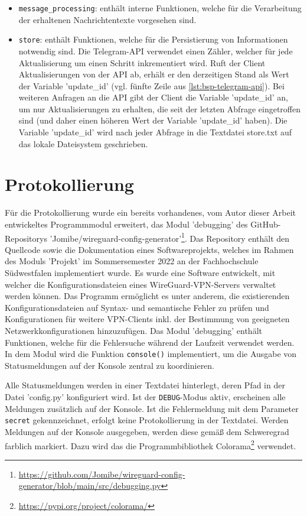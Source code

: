 \begin{itemize}
\item \lstinline{message_processing}: enthält interne Funktionen, welche für die Verarbeitung der erhaltenen Nachrichtentexte vorgesehen sind. 
\item \lstinline{store}: enthält Funktionen, welche für die Persistierung von Informationen notwendig sind. Die Telegram-API verwendet einen Zähler, welcher für jede Aktualisierung um einen Schritt inkrementiert wird. Ruft der Client Aktualisierungen von der API ab, erhält er den derzeitigen Stand als Wert der Variable 'update\_id' (vgl. fünfte Zeile aus \autoref{lst:bsp-telegram-api}). Bei weiteren Anfragen an die API gibt der Client die Variable 'update\_id' an, um nur Aktualisierungen zu erhalten, die seit der letzten Abfrage eingetroffen sind (und daher einen höheren Wert der Variable 'update\_id' haben). Die Variable 'update\_id' wird nach jeder Abfrage in die Textdatei store.txt auf das lokale Dateisystem geschrieben.
\end{itemize}

\section{Protokollierung}
\label{sec:protokollierung}

Für die Protokollierung wurde ein bereits vorhandenes, vom Autor dieser Arbeit entwickeltes Programmmodul erweitert, das Modul 'debugging' des GitHub-Repositorys 'Jomibe/wireguard-config-generator'\footnote{\url{https://github.com/Jomibe/wireguard-config-generator/blob/main/src/debugging.py}}. Das Repository enthält den Quellcode sowie die Dokumentation eines Softwareprojekts, welches im Rahmen des Moduls 'Projekt' im Sommersemester 2022 an der Fachhochschule Südwestfalen implementiert wurde. Es wurde eine Software entwickelt, mit welcher die Konfigurationsdateien eines WireGuard-VPN-Servers verwaltet werden können. Das Programm ermöglicht es unter anderem, die existierenden Konfigurationsdateien auf Syntax- und semantische Fehler zu prüfen und Konfigurationen für weitere VPN-Clients inkl. der Bestimmung von geeigneten Netzwerkkonfigurationen hinzuzufügen. Das Modul 'debugging' enthält Funktionen, welche für die Fehlersuche während der Laufzeit verwendet werden. In dem Modul wird die Funktion \lstinline{console()} implementiert, um die Ausgabe von Statusmeldungen auf der Konsole zentral zu koordinieren. 

Alle Statusmeldungen werden in einer Textdatei hinterlegt, deren Pfad in der Datei 'config.py' konfiguriert wird. Ist der \lstinline{DEBUG}-Modus aktiv, erscheinen alle Meldungen zusätzlich auf der Konsole. Ist die Fehlermeldung mit dem Parameter \lstinline{secret} gekennzeichnet, erfolgt keine Protokollierung in der Textdatei. Werden Meldungen auf der Konsole ausgegeben, werden diese gemäß dem Schweregrad farblich markiert. Dazu wird das die Programmbibliothek Colorama\footnote{\url{https://pypi.org/project/colorama/}} verwendet.

